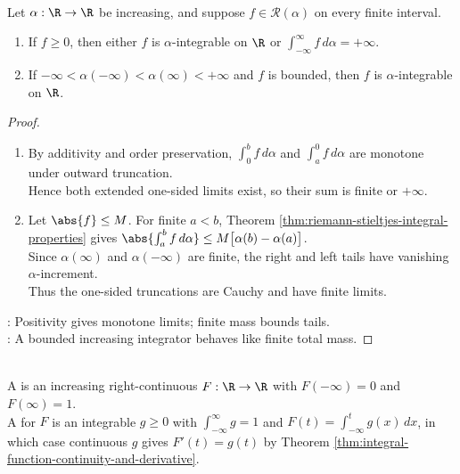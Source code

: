 \begin{theorem} \label{thm:improper-riemann-stieltjes-nonnegative-bounded-mass} \\
Let $\alpha:\R\to\R$ be increasing, and suppose $f\in\mathcal{R}(\alpha)$ on every finite interval.
\begin{enumerate}[label=(\roman*)]
\setlength{\itemsep}{0pt}
\item If $f\geq0$, then either $f$ is $\alpha$-integrable on $\R$ or $\int_{-\infty}^{\infty}f\,d\alpha=+\infty$.
\item If $-\infty<\alpha(-\infty)<\alpha(\infty)<+\infty$ and $f$ is bounded, then $f$ is $\alpha$-integrable on $\R$.
\end{enumerate}
\begin{proof}
\begin{enumerate}[label=(\roman*)]
\setlength{\itemsep}{0pt}
\item
By additivity and order preservation, $\int_0^b f\,d\alpha$ and $\int_a^0 f\,d\alpha$ are monotone under outward truncation.\\
Hence both extended one-sided limits exist, so their sum is finite or $+\infty$.
\item
Let $\abs{f}\leq M$. For finite $a<b$, Theorem \ref{thm:riemann-stieltjes-integral-properties} gives $\abs{\int_a^b f\,d\alpha}\leq M\bigl[\alpha(b)-\alpha(a)\bigr]$.\\
Since $\alpha(\infty)$ and $\alpha(-\infty)$ are finite, the right and left tails have vanishing $\alpha$-increment.\\
Thus the one-sided truncations are Cauchy and have finite limits.
\end{enumerate}
: Positivity gives monotone limits; finite mass bounds tails.\\
: A bounded increasing integrator behaves like finite total mass.
\end{proof}
\end{theorem}

\begin{definition} \label{def:distribution-function-and-density} \\
A  is an increasing right-continuous $F:\R\to\R$ with $F(-\infty)=0$ and $F(\infty)=1$.\\
A  for $F$ is an integrable $g\geq0$ with $\int_{-\infty}^{\infty}g=1$ and $F(t)=\int_{-\infty}^{t}g(x)\,dx$, in which case continuous $g$ gives $F'(t)=g(t)$ by Theorem \ref{thm:integral-function-continuity-and-derivative}.
\end{definition}

